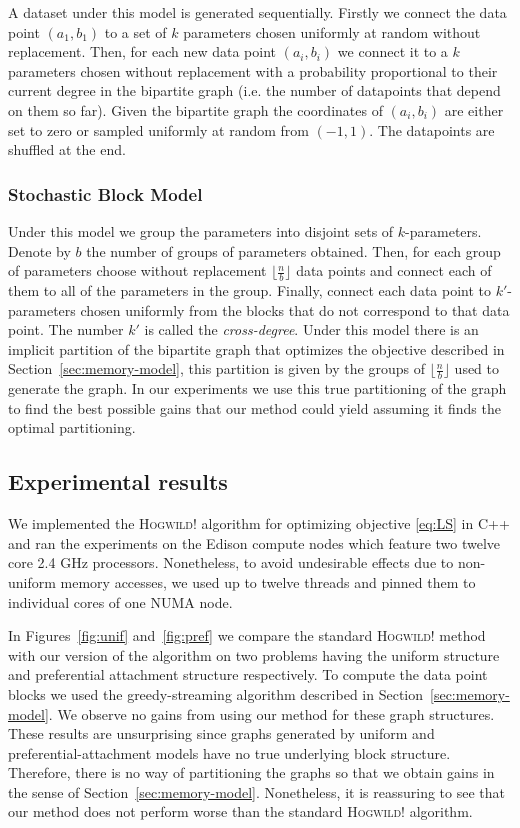 \documentclass[times,11pt]{article}
\numberwithin{equation}{section}		%
\numberwithin{figure}{section}			%
\numberwithin{table}{section}				%
\newcommand{\HW}{\textsc{Hogwild!}}
\begin{document}
A dataset under this model is generated sequentially. Firstly we connect the data point $(a_1, b_1)$ to a set of $k$ parameters chosen uniformly at random without replacement. Then, for each new data point $(a_i, b_i)$ we connect it to a $k$ parameters chosen without replacement with a probability proportional to their current degree in the bipartite graph (i.e. the number of datapoints that depend on them so far). Given the bipartite graph the coordinates of $(a_i, b_i)$ are either set to zero or sampled uniformly at random from $(-1,1)$. The datapoints are shuffled at the end.


\subsubsection*{Stochastic Block Model}

Under this model we group the parameters into disjoint sets of $k$-parameters. Denote by $b$ the number of groups of parameters obtained. Then, for each group of parameters choose without replacement $\lfloor \frac{n}{b}\rfloor$ data points and connect each of them to all of the parameters in the group. Finally, connect each data point to $k'$-parameters chosen uniformly from the blocks that do not correspond to that data point. The number $k'$ is called the \emph{cross-degree}. Under this model there is an implicit partition of the bipartite graph that optimizes the objective described in Section~\ref{sec:memory-model}, this partition is given by the groups of $\lfloor \frac{n}{b}\rfloor$ used to generate the graph. In our experiments we use this true partitioning of the graph to find the best possible gains that our method could yield assuming it finds the optimal partitioning.
   
\subsection{Experimental results}

We implemented the \HW{} algorithm for optimizing objective \eqref{eq:LS} in C++ and ran the experiments on the Edison compute nodes which feature two twelve core 2.4 GHz processors. 
Nonetheless, to avoid undesirable effects due to non-uniform memory accesses, we used up to twelve threads and pinned them to individual cores of one NUMA node. 

In Figures~\ref{fig:unif} and~\ref{fig:pref} we compare the standard \HW{} method with our version of the algorithm on two problems having the uniform structure and preferential attachment structure respectively. To compute the data point blocks we used the greedy-streaming algorithm described in Section~\ref{sec:memory-model}. We observe no gains from using our method for these graph structures. These results are unsurprising since graphs generated by uniform and preferential-attachment models have no true underlying block structure. Therefore, there is no way of partitioning the graphs so that we obtain gains in the sense of Section~\ref{sec:memory-model}. Nonetheless, it is reassuring to see that our method does not perform worse than the standard \HW{} algorithm. 
\end{document}
